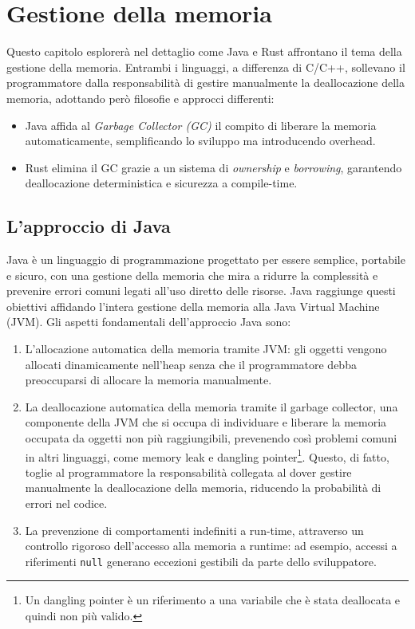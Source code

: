 
\chapter{Gestione della memoria}
Questo capitolo esplorerà nel dettaglio come Java e Rust affrontano il tema della gestione della memoria. Entrambi i linguaggi, a differenza di C/C++, sollevano il programmatore dalla responsabilità di gestire manualmente la deallocazione della memoria, adottando però filosofie e approcci differenti:
\begin{itemize}
    \item Java affida al \textit{Garbage Collector (GC)} il compito di liberare la memoria automaticamente, semplificando lo sviluppo ma introducendo overhead. 
    \item Rust elimina il GC grazie a un sistema di \textit{ownership} e \textit{borrowing}, garantendo deallocazione deterministica e sicurezza a compile-time. 
\end{itemize}
\section{L'approccio di Java}
Java è un linguaggio di programmazione progettato per essere semplice, portabile e sicuro, con una gestione della memoria che mira a ridurre la complessità e prevenire errori comuni legati all'uso diretto delle risorse. Java raggiunge questi obiettivi affidando l'intera gestione della memoria alla Java Virtual Machine (JVM). Gli aspetti fondamentali dell'approccio Java sono:

\begin{enumerate}
\item L'allocazione automatica della memoria tramite JVM: gli oggetti vengono allocati dinamicamente nell'heap senza che il programmatore debba preoccuparsi di allocare la memoria manualmente. 
\item La deallocazione automatica della memoria tramite il garbage collector, una componente della JVM che si occupa di individuare e liberare la memoria occupata da oggetti non più raggiungibili, prevenendo così problemi comuni in altri linguaggi, come memory leak e dangling pointer\footnote{Un dangling pointer è un riferimento a una variabile che è stata deallocata e quindi non più valido.}. Questo, di fatto, toglie al programmatore la responsabilità collegata al dover gestire manualmente la deallocazione della memoria, riducendo la probabilità di errori nel codice.
\item La prevenzione di comportamenti indefiniti a run-time, attraverso un controllo rigoroso dell'accesso alla memoria a runtime: ad esempio, accessi a riferimenti \texttt{null} generano eccezioni gestibili da parte dello sviluppatore. 
\end{enumerate}

